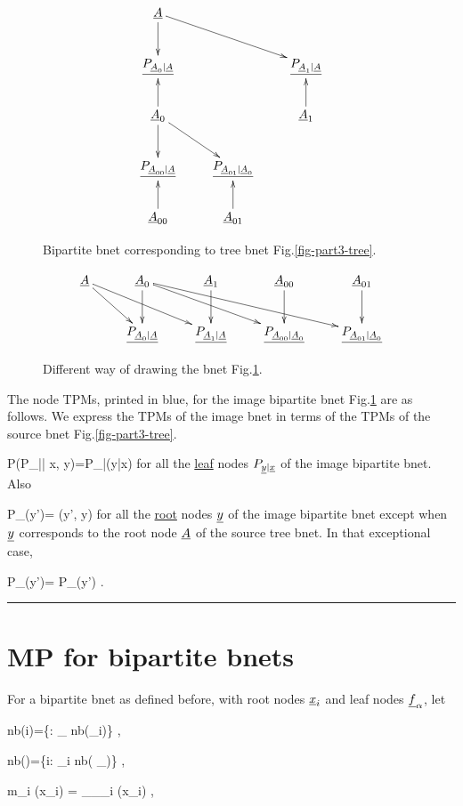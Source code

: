 \begin{figure}[h!]
$$\xymatrix{
\rvA\ar[d]\ar[rrd]
\\
\ul{P_{\rvA_0|\rvA}}&&\ul{P_{\rvA_1|\rvA}}
\\
\rvA_0\ar[u]\ar[d]\ar[rd]&&\rvA_1\ar[u]
\\
\ul{P_{\rvA_{00}|\rvA}}&\ul{P_{\rvA_{01}|\rvA_0}}
\\
\rvA_{00}\ar[u]&\rvA_{01}\ar[u]
}
$$
\caption{Bipartite bnet
corresponding
to tree bnet Fig.\ref{fig-part3-tree}.}
\label{fig-part3-tree-junc-tree}
\end{figure}

\begin{figure}[h!]
\centering
$$\xymatrix{
\rvA\ar[dr]\ar[drr]
&\rvA_{0}\ar[d]\ar[drr]\ar[drrr]
&\rvA_{1}\ar[d]
&\rvA_{00}\ar[d]
&\rvA_{01}\ar[d]
\\
&\ul{P_{\rvA_{0}|\rvA}}
&\ul{P_{\rvA_{1}|\rvA}}
&\ul{P_{\rvA_{00}|\rvA_0}}
&\ul{P_{\rvA_{01}|\rvA_0}}
}$$
\caption{
Different
way of drawing 
the bnet Fig.\ref{fig-part3-tree-junc-tree}.}
\label{fig-part3-tree-bip-bnet}
\end{figure}

The node  TPMs, printed in blue,
for the image bipartite bnet 
Fig.\ref{fig-part3-tree-junc-tree}
are as follows. We express the
TPMs of the image bnet
in terms of the 
TPMs of the source bnet 
Fig.\ref{fig-part3-tree}.

\beq\color{blue}
P(P_{\rvy|\rvx}| x, y)=P_{\rvy|\rvx}(y|x)
\eeq
for all the
\ul{leaf} 
nodes $P_{{\underline{y}}|{\underline{x}}}$ of the
image bipartite bnet.
Also

\beq\color{blue}
P_\rvy(y')= \delta(y', y)
\;
\eeq
for all the \ul{root} nodes ${\underline{y}}$ of the
image bipartite bnet
except when 
${\underline{y}}$ corresponds to
the root node ${\underline{A}}$
of the source tree bnet.
In that exceptional case,

\beq\color{blue}
P_\rvy(y')= P_\rvA(y')
\;.
\eeq


\hrule


\section*{MP for
bipartite bnets}
For
a bipartite 
bnet as defined before,
with
root nodes ${\underline{x}}_i$
and leaf nodes ${\underline{f}}_\alpha$,
let


\beq
nb(i)=\{\alp: \rvf_\alpha\in
nb(\rvx_i)\}
\;,
\eeq

\beq
nb(\alpha)=\{i: \rvx_i\in
nb( \rvf_\alpha)\}
\;,
\eeq

\beq
m_{\alp\larrow i}
(x_i)
=
\pi_{\rvf_\alpha \lcond\rvx_i }
(x_i)
\;,
\eeq

